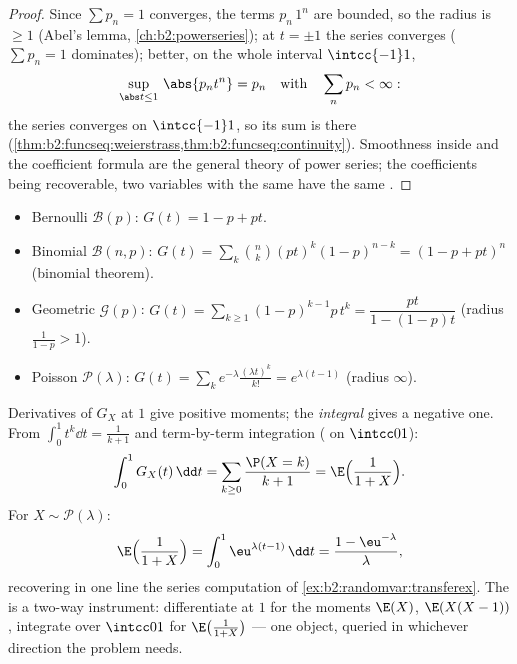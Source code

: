 \begin{proof}
Since $\sum p_n = 1$ converges, the terms $p_n\,1^n$ are bounded,
so the radius is $\geq 1$ (Abel's lemma,
\cref{ch:b2:powerseries}); at $t = \pm1$ the series converges
 ($\sum p_n = 1$ dominates); better, on the whole
interval $\intcc{-1}1$,
\[
\sup_{\abs t\leq1}\,\abs{p_nt^n} = p_n
\quad\text{with}\quad \sum_np_n < \infty :
\]
the series converges \emph{} on $\intcc{-1}1$, so
its sum is  there
(\cref{thm:b2:funcseq:weierstrass,thm:b2:funcseq:continuity}). Smoothness inside and the coefficient
formula are the general theory of power series; the coefficients
being recoverable, two variables with the same 
have the same .
\end{proof}

\begin{example}\label{ex:b2:genfun:classical}
\leavevmode
\begin{itemize}
\item Bernoulli $\mathcal{B}(p)$: $G(t) = 1 - p + pt$.
\item Binomial $\mathcal{B}(n, p)$: $G(t) = \sum_k \binom nk
(pt)^k(1-p)^{n-k} = (1 - p + pt)^n$ (binomial theorem).
\item Geometric $\mathcal{G}(p)$: $G(t) =
\sum_{k\geq1}(1-p)^{k-1}p\,t^k = \dfrac{pt}{1 - (1-p)t}$ (radius
$\frac{1}{1-p} > 1$).
\item Poisson $\mathcal{P}(\lambda)$: $G(t) =
\sum_k e^{-\lambda}\frac{(\lambda t)^k}{k!} = e^{\lambda(t - 1)}$
(radius $\infty$).
\end{itemize}
\end{example}

\begin{example}\label{ex:b2:genfun:integraltrick}
Derivatives of $G_X$ at $1$ give positive moments; the
\emph{integral} gives a negative one. From $\int_0^1t^k\dd t
= \frac1{k+1}$ and term-by-term integration ( on $\intcc01$):
\[
\int_0^1G_X(t)\,\dd t = \sum_{k\geq0}\frac{\P(X =
k)}{k+1} = \E\Bigl(\frac1{1+X}\Bigr).
\]
For $X \sim \mathcal P(\lambda)$:
\[
\E\Bigl(\frac1{1+X}\Bigr) =
\int_0^1\eu^{\lambda(t-1)}\,\dd t = \frac{1 -
\eu^{-\lambda}}{\lambda},
\]
recovering in one line the series computation of
\cref{ex:b2:randomvar:transferex}. The 
is a two-way instrument: differentiate at $1$ for the
moments $\E(X)$, $\E(X(X-1))$, integrate over $\intcc01$
for $\E\bigl(\frac1{1+X}\bigr)$ --- one  object,
queried in whichever direction the problem needs.
\end{example}

